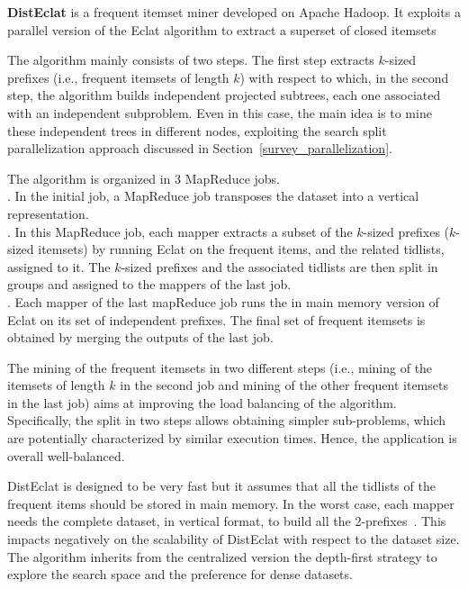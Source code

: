 {\bf DistEclat} is a frequent itemset miner developed on Apache Hadoop. It exploits
a parallel version of the Eclat algorithm to extract a superset of closed itemsets

The algorithm mainly consists of two steps. The first step extracts $k$-sized prefixes (i.e., frequent itemsets of length $k$) with respect to which, in
the second step, the algorithm builds independent projected subtrees, each one associated with an independent subproblem. Even in this case,
the main idea is to mine these independent trees in different nodes, exploiting the search split parallelization approach discussed in 
Section~\ref{survey_parallelization}. 

The algorithm is organized in 3 MapReduce jobs. \\ 
. In the initial job, a MapReduce job transposes
the dataset into a vertical representation. \\
. In this MapReduce job, each mapper extracts a subset of the $k$-sized prefixes ($k$-sized itemsets)
by running Eclat on the frequent items, and the related tidlists, assigned to it. The $k$-sized prefixes and the associated tidlists are then split in groups and assigned to the mappers of the last job.  \\
. Each mapper of the last mapReduce job runs the in main memory version of Eclat 
on its set of independent prefixes. The final set of frequent itemsets is obtained by merging the outputs of the last job. 

The mining of the frequent itemsets in two different steps (i.e., mining of the itemsets of length $k$ in the second job and mining of the other frequent itemsets in the last job) aims at improving the load balancing of the algorithm. 
Specifically, the split in two steps allows obtaining simpler sub-problems, which are potentially characterized by similar execution times. Hence, the application is overall well-balanced.

DistEclat is designed to be very fast but it assumes that all the tidlists of the frequent items should be stored in main memory.
In the worst case, each mapper needs the complete dataset, in vertical format, to build all the 2-prefixes~\cite{bigfim}. This impacts 
negatively on the scalability of DistEclat with respect to the dataset size.
The algorithm inherits from the centralized version the depth-first strategy to
explore the search space and the preference for dense datasets.

